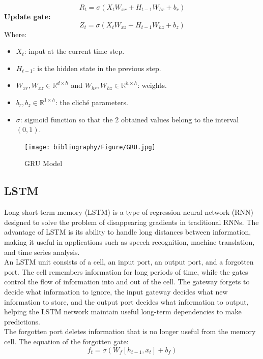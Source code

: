 \documentclass{ieeeojies}
\begin{document}
\[
R_t = \sigma(X_t W_{xr} + H_{t-1} W_{hr} + b_r)
\]
 \textbf{Update gate:} 
\[
Z_t = \sigma(X_t W_{xz} + H_{t-1} W_{hz} + b_z)
\]
Where:\\

\begin{itemize}
    \item $X_t$: input at the current time step.
    \item $H_{t-1}$: is the hidden state in the previous step.
    \item $W_{xr}, W_{xz} \in \mathbb{R}^{d \times h}$ and $W_{hr}, W_{hz} \in \mathbb{R}^{h \times h}$: weights.
    \item $b_r, b_z \in \mathbb{R}^{1 \times h}$: the cliché parameters.
    \item $\sigma$: sigmoid function so that the 2 obtained values belong to the interval $(0,1)$.
\end{itemize}

\vspace{-1em} %
\begin{figure}[H]
    \centering
    \texttt{[image: bibliography/Figure/GRU.jpg]}
    \caption{GRU Model}
    \label{fig:GRU_Model}
\end{figure}


\subsection{LSTM}
Long short-term memory (LSTM) is a type of regression neural network (RNN) designed to solve the problem of disappearing gradients in traditional RNNs. The advantage of LSTM is its ability to handle long distances between information, making it useful in applications such as speech recognition, machine translation, and time series analysis.
\\
An LSTM unit consists of a cell, an input port, an output port, and a forgotten port. The cell remembers information for long periods of time, while the gates control the flow of information into and out of the cell. The gateway forgets to decide what information to ignore, the input gateway decides what new information to store, and the output port decides what information to output, helping the LSTM network maintain useful long-term dependencies to make predictions.
\\
The forgotten port deletes information that is no longer useful from the memory cell. The equation of the forgotten gate:\\
\begin{equation*}
    f_t = \sigma(W_f [h_{t-1}, x_t] + b_f)
\end{equation*}
\end{document}
